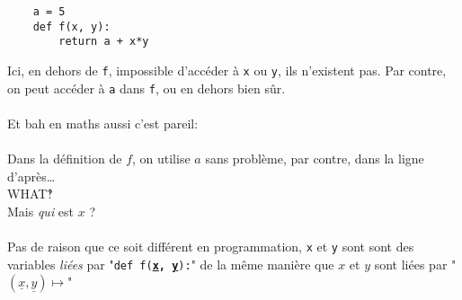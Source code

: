 \documentclass{article}
\newcommand{\singlecomparison}[2]{%
\begin{table}[H]
	\centering
	\begin{tabular}{p{7.5cm}|p{7.5cm}}
\begin{minipage}{0.5\linewidth}
\begin{verbatim}
#1
\end{verbatim}
\end{minipage}
       & #2
\end{tabular}
\end{table}
}
\begin{document}
\begin{verbatim}
	a = 5
	def f(x, y):
		return a + x*y
\end{verbatim}

Ici, en dehors de \texttt{f}, impossible d'accéder à \texttt{x} ou \texttt{y}, ils n'existent pas.
Par contre, on peut accéder à \texttt{a} dans \texttt{f}, ou en dehors bien sûr.\\

\paragraph{}
Et bah en maths aussi c'est pareil:
\paragraph{}
\paragraph{}
Dans la définition de $f$, on utilise $a$ sans problème, par contre, dans la ligne d'après\ldots
\vspace{.5cm}
\\{\Large{WHAT‽}}
\\{\large{Mais \emph{qui} est $x$ ?}}
\\\paragraph{}
Pas de raison que ce soit différent en programmation, 
\texttt{x} et \texttt{y} sont sont des variables \emph{liées} par "\texttt{def~f(\textbf{\underline{x},~\underline{y}}):}"
de la même manière que $x$ et $y$ sont liées par "$(\underline{x}, \underline{y}) \mapsto$"



\end{document}
